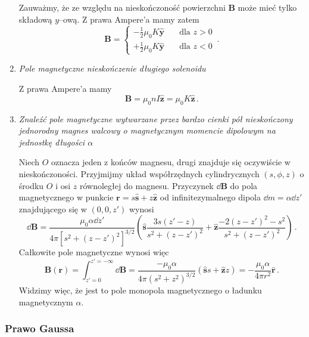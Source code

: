 \documentclass[../main.tex]{subfiles}
\begin{document}
\begin{enumerate}
    Zauważmy, że ze względu na nieskończoność powierzchni \(\mathbf{B}\) może mieć tylko składową \(y\)--ową. Z prawa Ampere'a mamy zatem
    \begin{equation*}
        \mathbf{B}=\begin{cases} -\frac{1}{2}\mu_0K\mathbf{\hat{y}}&\quad\text{dla \(z>0\)}\\+\frac{1}{2}\mu_0K\mathbf{\hat{y}}&\quad\text{dla \(z<0\)}\end{cases}\,.
    \end{equation*}
    
    \item \textit{Pole magnetyczne nieskończenie długiego solenoidu}
    \medskip
    
    Z prawa Ampere'a mamy
    \begin{equation*}
        \mathbf{B}=\mu_0nI\mathbf{\hat{z}}=\mu_0K\mathbf{\hat{z}}\,.
    \end{equation*}
    
    \item\textit{Znaleźć pole magnetyczne wytwarzane przez bardzo cienki pół nieskończony jednorodny magnes walcowy o magnetycznym momencie dipolowym na jednostkę długości \(\alpha\) }
    \medskip
    
    Niech \(O\) oznacza jeden z końców magnesu, drugi znajduje się oczywiście w nieskończoności. Przyjmijmy układ współrzędnych cylindrycznych \((s,\phi,z)\) o środku \(O\) i osi \(z\) równoległej do magnesu. Przyczynek \(\dd{\mathbf{B}}\) do pola magnetycznego w punkcie \(\mathbf{r}=s\mathbf{\hat{s}}+z\mathbf{\hat{z}}\) od infinitezymalnego dipola \(\dd{m}=\alpha\dd{z'}\) znajdującego się w \((0,0,z')\) wynosi
    \begin{equation*}
        \dd{\mathbf{B}}=\frac{\mu_0\alpha\dd{z'}}{4\pi[s^2+(z-z')^2]^{3/2}}\left(\mathbf{\hat{s}}\frac{3s(z'-z)}{s^2+(z-z')^2}+\mathbf{\hat{z}}\frac{-2(z-z')^2-s^2}{s^2+(z-z')^2}\right)\,.
    \end{equation*}
    Całkowite pole magnetyczne wynosi więc
    \begin{equation*}
        \mathbf{B}(\mathbf{r})=\int_{z'=0}^{z'=-\infty}\dd{\mathbf{B}}=\frac{-\mu_0\alpha}{4\pi(s^2+z^2)^{3/2}}(\mathbf{\hat{s}}s+\mathbf{\hat{z}}z)=-\frac{\mu_0\alpha}{4\pi r^2}\mathbf{\hat{r}}\,.
    \end{equation*}
    Widzimy więc, że jest to pole monopola magnetycznego o ładunku magnetycznym \(\alpha\).
\end{enumerate}
\subsubsection{Prawo Gaussa}
\noindent{}\\
\end{document}
